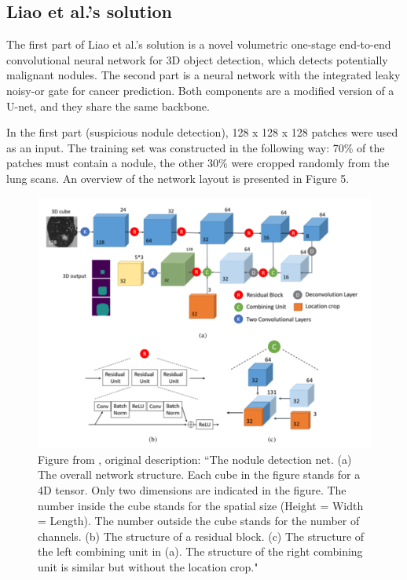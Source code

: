 \documentclass[12pt]{article}
\begin{document}
\subsection{Liao et al.'s solution}
The first part of Liao et al.'s solution is a novel volumetric one-stage end-to-end convolutional neural network for 3D object detection, which detects potentially malignant nodules. The second part is a neural network with the integrated leaky noisy-or gate for cancer prediction. Both components are a modified version of a U-net, and they share the same backbone. 

In the first part (suspicious nodule detection), 128 x 128 x 128 patches were used as an input. The training set was constructed in the following way: 70\% of the patches must contain a nodule, the other 30\% were cropped randomly from the lung scans. An overview of the network layout is presented in Figure 5.

\begin{figure}[h!]
\centering
\includegraphics[scale = 0.57]{liao.png}
\caption{Figure from \citep{liao2017evaluate}, original description: ``The nodule detection net. (a) The overall network structure. Each cube in the figure stands for a 4D tensor. Only two dimensions are indicated in the figure. The number inside the cube stands for the spatial size (Height = Width = Length). The number outside the cube stands for the number of channels. (b) The structure of a residual block. (c) The structure of the left combining unit in (a). The structure of the right combining unit is similar but without the location crop." }
\end{figure}
\end{document}
